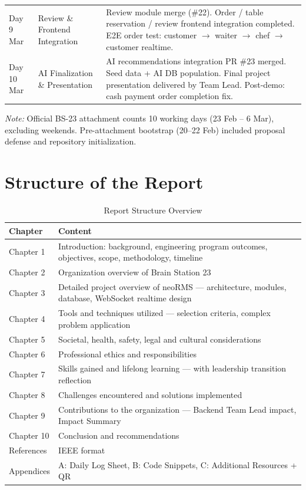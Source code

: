 \begin{table}[H]
\begin{tabularx}{\textwidth}{@{}p{}p{}X@{}}
Day 9 \newline 5 Mar & Review \& Frontend Integration & Review module merge (\#22). Order / table reservation / review frontend integration completed. E2E order test: customer $\rightarrow$ waiter $\rightarrow$ chef $\rightarrow$ customer realtime. \\
Day 10 \newline 6 Mar & AI Finalization \& Presentation & AI recommendations integration PR \#23 merged. Seed data + AI DB population. Final project presentation delivered by Team Lead. Post-demo: cash payment order completion fix. \\
\bottomrule
\end{tabularx}
\end{table}

\noindent\textit{Note:} Official BS-23 attachment counts 10 working days (23 Feb -- 6 Mar), excluding weekends. Pre-attachment bootstrap (20--22 Feb) included proposal defense and repository initialization.

\section{Structure of the Report}
\label{sec:structure}

\begin{table}[H]
\centering
\caption{Report Structure Overview}
\label{tab:report_structure}
\begin{tabularx}{\textwidth}{@{}p{}X@{}}
\toprule
\textbf{Chapter} & \textbf{Content} \\
\midrule
Chapter 1 & Introduction: background, engineering program outcomes, objectives, scope, methodology, timeline \\
Chapter 2 & Organization overview of Brain Station 23 \\
Chapter 3 & Detailed project overview of neoRMS --- architecture, modules, database, WebSocket realtime design \\
Chapter 4 & Tools and techniques utilized --- selection criteria, complex problem application \\
Chapter 5 & Societal, health, safety, legal and cultural considerations \\
Chapter 6 & Professional ethics and responsibilities \\
Chapter 7 & Skills gained and lifelong learning --- with leadership transition reflection \\
Chapter 8 & Challenges encountered and solutions implemented \\
Chapter 9 & Contributions to the organization --- Backend Team Lead impact, Impact Summary \\
Chapter 10 & Conclusion and recommendations \\
References & IEEE format \\
Appendices & A: Daily Log Sheet, B: Code Snippets, C: Additional Resources + QR \\
\bottomrule
\end{tabularx}
\end{table}

